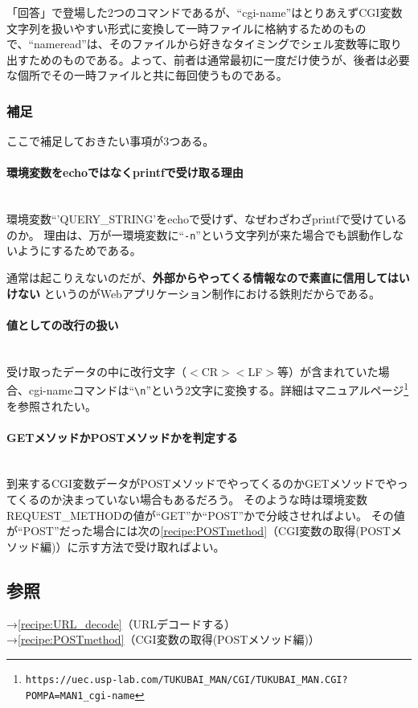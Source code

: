「回答」で登場した2つのコマンドであるが、``cgi-name''はとりあえずCGI変数文字列を扱いやすい形式に変換して一時ファイルに格納するためのもので、``nameread''は、そのファイルから好きなタイミングでシェル変数等に取り出すためのものである。よって、前者は通常最初に一度だけ使うが、後者は必要な個所でその一時ファイルと共に毎回使うものである。

\subsubsection*{補足}

ここで補足しておきたい事項が3つある。

\paragraph{環境変数をechoではなくprintfで受け取る理由}　\\
環境変数``'QUERY\_{}STRING'をechoで受けず、なぜわざわざprintfで受けているのか。
理由は、万が一環境変数に``\verb|-n|''という文字列が来た場合でも誤動作しないようにするためである。

通常は起こりえないのだが、\textbf{外部からやってくる情報なので素直に信用してはいけない}
というのがWebアプリケーション制作における鉄則だからである。

\paragraph{値としての改行の扱い}　\\
受け取ったデータの中に改行文字（$<$CR$>$$<$LF$>$等）が含まれていた場合、cgi-nameコマンドは``\verb|\n|''という2文字に変換する。詳細はマニュアルページ\footnote{\verb|https://uec.usp-lab.com/TUKUBAI_MAN/CGI/TUKUBAI_MAN.CGI?POMPA=MAN1_cgi-name|}を参照されたい。

\paragraph{GETメソッドかPOSTメソッドかを判定する}　\\
到来するCGI変数データがPOSTメソッドでやってくるのかGETメソッドでやってくるのか決まっていない場合もあるだろう。
そのような時は環境変数REQUEST\_{}METHODの値が``GET''か``POST''かで分岐させればよい。
その値が``POST''だった場合には次の\ref{recipe:POSTmethod}（CGI変数の取得(POSTメソッド編)）に示す方法で受け取ればよい。

\subsection*{参照}

\noindent
→\ref{recipe:URL_decode}（URLデコードする） \\
→\ref{recipe:POSTmethod}（CGI変数の取得(POSTメソッド編)）
